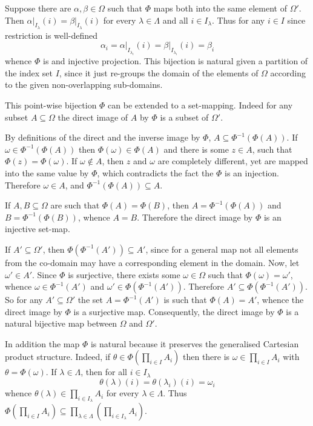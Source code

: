 \documentclass[a4paper]{article}
\newcommand{\brac}[1]{\left ( #1 \right )}
\newcommand{\induc}[1]{\left . #1 \right \vert}
\begin{document}
Suppose there are $\alpha, \beta \in \Omega$ such that $\Phi$ maps both into the same element of $\Omega'$. Then $\induc{\alpha}_{I_\lambda}\brac{i}=\induc{\beta}_{I_\lambda}\brac{i}$ for every $\lambda \in \Lambda$ and all $i\in I_\lambda$. Thus for any $i\in I$ since restriction is well-defined \[\alpha_i = \induc{\alpha}_{I_{\lambda_i}}\brac{i} = \induc{\beta}_{I_{\lambda_i}}\brac{i} = \beta_i\] whence $\Phi$ is and injective projection. This bijection is natural given a partition of the index set $I$, since it just re-groups the domain of the elements of $\Omega$ according to the given non-overlapping sub-domains. 

This point-wise bijection $\Phi$ can be extended to a set-mapping. Indeed for any subset $A\subseteq \Omega$ the direct image of $A$ by $\Phi$ is a subset of $\Omega'$.

By definitions of the direct and the inverse image by $\Phi$, $A \subseteq \Phi^{-1}\brac{\Phi\brac{A}}$. If $\omega\in \Phi^{-1}\brac{\Phi\brac{A}}$ then $\Phi\brac{\omega} \in \Phi(A)$ and there is some $z \in A$, such that $\Phi\brac{z} = \Phi\brac{\omega}$. If $\omega \notin A$, then $z$ and $\omega$ are completely different, yet are mapped into the same value by $\Phi$, which contradicts the fact the $\Phi$ is an injection. Therefore $\omega \in A$, and $\Phi^{-1}\brac{\Phi\brac{A}} \subseteq A$.

If $A, B \subseteq \Omega$ are such that $\Phi\brac{A} = \Phi\brac{B}$, then $A = \Phi^{-1}\brac{\Phi\brac{A}}$ and $B = \Phi^{-1}\brac{\Phi\brac{B}}$, whence $A = B$. Therefore the direct image by $\Phi$ is an injective set-map.

If $A' \subseteq \Omega'$, then $\Phi\brac{\Phi^{-1}\brac{A'}} \subseteq A'$, since for a general map not all elements from the co-domain may have a corresponding element in the domain. Now, let $\omega' \in A'$. Since $\Phi$ is surjective, there exists some $\omega \in \Omega$ such that $\Phi\brac{\omega} = \omega'$, whence $\omega \in \Phi^{-1}\brac{A'}$ and $\omega' \in \Phi\brac{\Phi^{-1}\brac{A'}}$. Therefore $A' \subseteq \Phi\brac{\Phi^{-1}\brac{A'}}$. So for any $A' \subseteq \Omega'$ the set $A = \Phi^{-1}\brac{A'}$ is such that $\Phi\brac{ A } = A'$, whence the direct image by $\Phi$ is a surjective map. Consequently, the direct image by $\Phi$ is a natural bijective map between $\Omega$ and $\Omega'$.

In addition the map $\Phi$ is natural because it preserves the generalised Cartesian product structure. Indeed, if $\theta \in \Phi\brac{\prod_{i\in I} A_i}$ then there is $\omega \in \prod_{i\in I} A_i$ with $\theta = \Phi\brac{\omega}$. If $\lambda\in \Lambda$, then for all $i\in I_\lambda$ \[\theta\brac{\lambda}\brac{i} = \theta\brac{\lambda_i}\brac{i} = \omega_i\] whence $\theta\brac{\lambda}\in \prod_{i\in I_\lambda} A_i$ for every $\lambda\in \Lambda$. Thus $\Phi\brac{\prod_{i\in I} A_i} \subseteq \prod_{\lambda\in\Lambda} \brac{\prod_{i\in I_\lambda} A_i}$.
\end{document}
